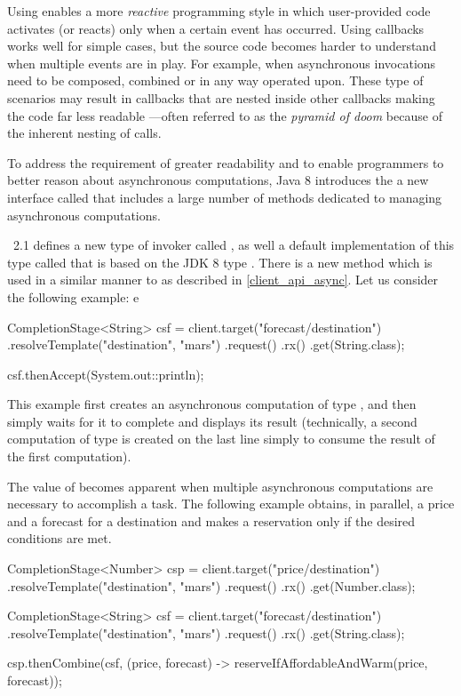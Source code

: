 Using  enables a more \emph{reactive} programming style in which user-provided code activates (or reacts) only when a certain event has occurred. Using callbacks works well for simple cases, but the source code becomes harder to understand when multiple events are in play. For example, when asynchronous invocations need to be composed, combined or in any way operated upon. These type of scenarios may result in callbacks that are nested inside other callbacks making the code far less readable ---often referred to as the \emph{pyramid of doom} because of the inherent nesting of calls.

To address the requirement of greater readability and to enable programmers to better reason about asynchronous computations, Java 8 introduces the a new interface called  that includes a large number of methods dedicated to managing asynchronous computations. 

\jaxrs\ 2.1 defines a new type of invoker called , as well a default implementation of this type called  that is based on the JDK 8 type . There is a new  method which is used in a similar manner to  as described in \ref{client_api_async}. Let us consider the following example:
e
\begin{listing}{1}
    CompletionStage<String> csf = client.target("forecast/{destination}")
        .resolveTemplate("destination", "mars")
        .request()
        .rx()
        .get(String.class);

    csf.thenAccept(System.out::println);
\end{listing}

This example first creates an asynchronous computation of type , and then simply waits for it to complete and displays its result (technically, a second computation of type  is created on the last line simply to consume the result of the first computation). 

The value of  becomes apparent when multiple asynchronous computations are necessary to accomplish a task. The following example obtains, in parallel, a price and a forecast for a destination and makes a reservation only if the desired conditions are met. 

\begin{listing}{1}
	CompletionStage<Number> csp = client.target("price/{destination}")
        .resolveTemplate("destination", "mars")
        .request()
        .rx()
        .get(Number.class);

	CompletionStage<String> csf = client.target("forecast/{destination}")
	    .resolveTemplate("destination", "mars")
	    .request()
	    .rx()
	    .get(String.class);
	
	csp.thenCombine(csf, (price, forecast) -> 
	    reserveIfAffordableAndWarm(price, forecast));
\end{listing}

